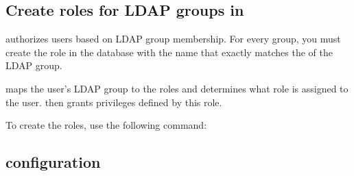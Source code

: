 \documentclass[letterpaper,10pt,english]{sphinxmanual}
\begin{document}
\subsection{Create roles for LDAP groups in }
\label{\detokenize{ldap-setup:create-roles-for-ldap-groups-in-psmdb}}
\sphinxAtStartPar
{} authorizes users based on LDAP group membership. For every group, you must create the role in the  database with the name that exactly matches the  of the LDAP group.

\sphinxAtStartPar
{} maps the user’s LDAP group to the roles and determines what role is assigned to the user.  then grants privileges defined by this role.

\sphinxAtStartPar
To create the roles, use the following command:

\begin{sphinxVerbatim}[commandchars=\\\{\}]
\PYG{p}{[}\PYG{p}{]}
\PYG{p}{[}\PYG{p}{]}

\PYG{p}{[}\PYG{p}{]}
\PYG{p}{[}\PYG{p}{]}
\end{sphinxVerbatim}


\subsection{ configuration}
\label{\detokenize{ldap-setup:psmdb-configuration}}
\end{document}
